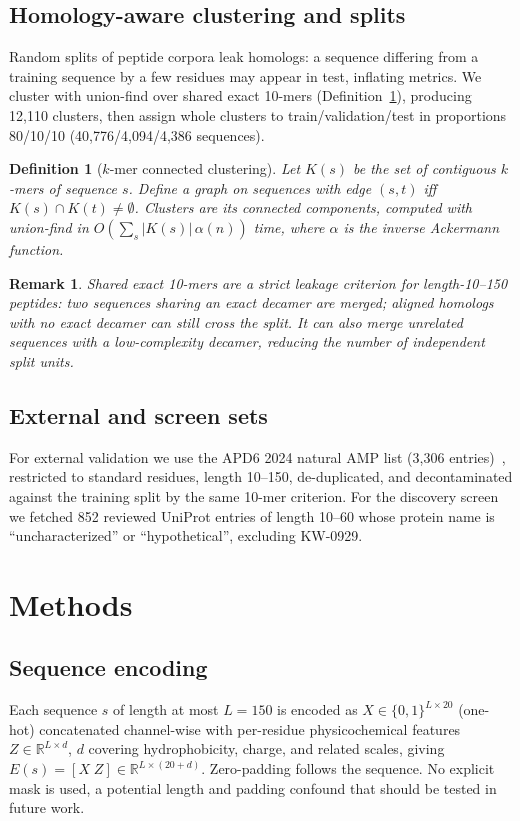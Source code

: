 \documentclass[12pt]{article}
\newtheorem{definition}{Definition}
\newtheorem{remark}{Remark}
\newcommand{\Nclusters}{12{,}110}
\newcommand{\Ntrain}{40{,}776}
\newcommand{\Nval}{4{,}094}
\newcommand{\Ntest}{4{,}386}
\begin{document}
\subsection{Homology-aware clustering and splits}
Random splits of peptide corpora leak homologs: a sequence differing from a
training sequence by a few residues may appear in test, inflating metrics.
We cluster with union-find over shared exact 10-mers
(Definition~\ref{def:cluster}), producing \Nclusters{} clusters, then assign
whole clusters to train/validation/test in proportions 80/10/10
(\Ntrain{}/\Nval{}/\Ntest{} sequences).

\begin{definition}[$k$-mer connected clustering]\label{def:cluster}
Let $K(s)$ be the set of contiguous $k$-mers of sequence $s$. Define a graph
on sequences with edge $(s,t)$ iff $K(s)\cap K(t)\neq\emptyset$. Clusters are
its connected components, computed with union-find in
$O(\sum_s |K(s)|\,\alpha(n))$ time, where $\alpha$ is the inverse Ackermann
function.
\end{definition}

\begin{remark}
Shared exact 10-mers are a strict leakage criterion for length-10--150
peptides: two sequences sharing an exact decamer are merged; aligned homologs with
no exact decamer can still cross the split. It can also merge unrelated sequences with a low-complexity decamer,
reducing the number of independent split units.
\end{remark}

\subsection{External and screen sets}
For external validation we use the APD6 2024 natural AMP list (3{,}306
entries)~\cite{apd3}, restricted to standard residues, length 10--150,
de-duplicated, and decontaminated against the training split by the same
10-mer criterion. For the discovery screen we fetched 852 reviewed UniProt
entries of length 10--60 whose protein name is ``uncharacterized'' or
``hypothetical'', excluding KW-0929.

\section{Methods}
\subsection{Sequence encoding}
Each sequence $s$ of length at most $L=150$ is encoded as
$X\in\{0,1\}^{L\times 20}$ (one-hot) concatenated channel-wise with
per-residue physicochemical features $Z\in\mathbb{R}^{L\times d}$,
$d$ covering hydrophobicity, charge, and related scales, giving
$E(s)=[X\;Z]\in\mathbb{R}^{L\times(20+d)}$. Zero-padding follows the sequence. No explicit mask is used, a potential
length and padding confound that should be tested in future work.
\end{document}
